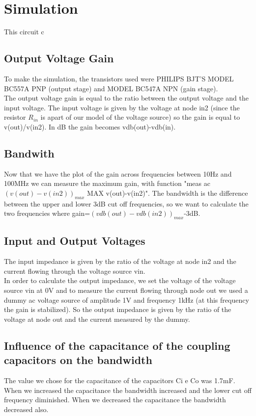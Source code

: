 \section{Simulation}
This circuit c
\subsection{Output Voltage Gain}
To make the simulation, the transistors used were PHILIPS BJT'S MODEL BC557A PNP (output stage) and MODEL BC547A NPN (gain stage). \\
The output voltage gain is equal to the ratio between the output voltage and the input voltage. The input voltage is given by the voltage at node in2 (since the resistor $R_{in}$ is apart of our model of the voltage source) so the gain is equal to v(out)/v(in2). In dB the gain becomes vdb(out)-vdb(in).
\subsection{Bandwith}
Now that we have the plot of the gain across frequencies between 10Hz and 100MHz we can measure the maximum gain, with function "meas ac $(v(out)-v(in2))_{max}$ MAX v(out)-v(in2)". The bandwidth is the difference between the upper and lower 3dB cut off frequencies, so we want to calculate the two frequencies where gain=$(vdb(out)-vdb(in2))_{max}$-3dB. 

\subsection{Input and Output Voltages}
The input impedance is given by the ratio of the voltage at node in2 and the current flowing through the voltage source vin. \\
In order to calculate the output impedance, we set the voltage of the voltage source vin at 0V and to measure the current flowing through node out we used a dummy ac voltage source of amplitude 1V and frequency 1kHz (at this frequency the gain is stabilized). So the output impedance is given by the ratio of the voltage at node out and the current measured by the dummy. 

\subsection{Influence of the capacitance of the coupling capacitors on the bandwidth}
The value we chose for the capacitance of the capacitors Ci e Co was 1.7mF. When we increased the capacitance the bandwidth increased and the lower cut off frequency diminished. When we decreased the capacitance the bandwidth decreased also.

